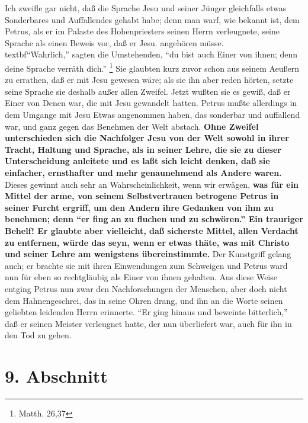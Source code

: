 Ich zweifle gar nicht, daß die Sprache Jesu und seiner Jünger gleichfalls etwas
Sonderbares und Auffallendes gehabt habe; denn man warf, wie bekannt ist, dem
Petrus, als er im Palaste des Hohenpriesters seinen Herrn verleugnete, seine
Sprache als einen Beweis vor, daß er Jesu. angehören müsse.\\textbf{"`Wahrlich,"' sagten
die Umstehenden, "`du bist auch Einer von ihnen; denn deine Sprache verräth
dich."'}
\footnote{Matth. 26,37} Sie glaubten kurz zuvor schon aus seinem Aeußern
zu errathen, daß er mit Jesu gewesen wäre; als sie ihn aber reden hörten, setzte
seine Sprache sie deshalb außer allen Zweifel. Jetzt wußten sie es gewiß, daß er
Einer von Denen war, die mit Jesu gewandelt hatten. Petrus mußte allerdings in
dem Umgange mit Jesu Etwas angenommen haben, das sonderbar und auffallend war,
und ganz gegen das Benehmen der Welt abstach. \textbf{Ohne Zweifel unterschieden sich
die Nachfolger Jesu von der Welt sowohl in ihrer Tracht, Haltung und Sprache,
als in seiner Lehre, die sie zu dieser Unterscheidung anleitete und es laßt sich
leicht denken, daß sie einfacher, ernsthafter und mehr genaunehmend als Andere
waren.} Dieses gewinnt auch sehr an Wahrscheinlichkeit, wenn wir erwägen, \textbf{was für
ein Mittel der arme, von seinem Selbstvertrauen betrogene Petrus in seiner
Furcht ergriff, um den Andern ihre Gedanken von ihm zu benehmen; denn "`er fing
an zu fluchen und zu schwören."' Ein trauriger Behelf! Er glaubte aber
vielleicht, daß sicherste Mittel, allen Verdacht zu entfernen, würde das seyn,
wenn er etwas thäte, was mit Christo und seiner Lehre am wenigstens
übereinstimmte.} Der Kunstgriff gelang auch; er brachte sie mit ihren
Einwendungen zum Schweigen und Petrus ward nun für eben so rechtgläubig als
Einer von ihnen gehalten. Aus diese Weise entging Petrus nun zwar den
Nachforschungen der Menschen, aber doch nicht dem Hahnengeschrei, das in seine
Ohren drang, und ihn an die Worte seinen geliebten leidenden Herrn erinnerte.
"`Er ging hinaus und beweinte bitterlich,"' daß er seinen Meister verleugnet
hatte, der nun überliefert war, auch für ihn in den Tod zu gehen.

\section{9. Abschnitt} \label{kap10_ab9}

